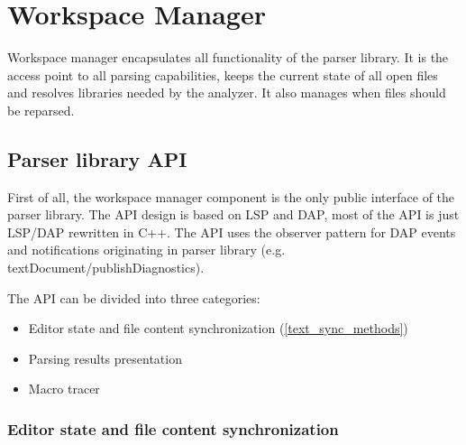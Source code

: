 \chapter{Workspace Manager}
\label{ws_manager}
Workspace manager encapsulates all functionality of the parser library. It is the access point to all parsing capabilities, keeps the current state of all open files and resolves libraries needed by the analyzer. It also manages when files should be reparsed.

\section{Parser library API}

First of all, the workspace manager component is the only public interface of the parser library. The API design is based on LSP and DAP, most of the API is just LSP/DAP rewritten in C++. The API uses the observer pattern for DAP events and notifications originating in parser library (e.g. textDocument/publishDiagnostics).

The API can be divided into three categories:
\begin{itemize}
	\item Editor state and file content synchronization (\cref{text_sync_methods})
	\item Parsing results presentation 
	\item Macro tracer
\end{itemize}

\subsection{Editor state and file content synchronization}


